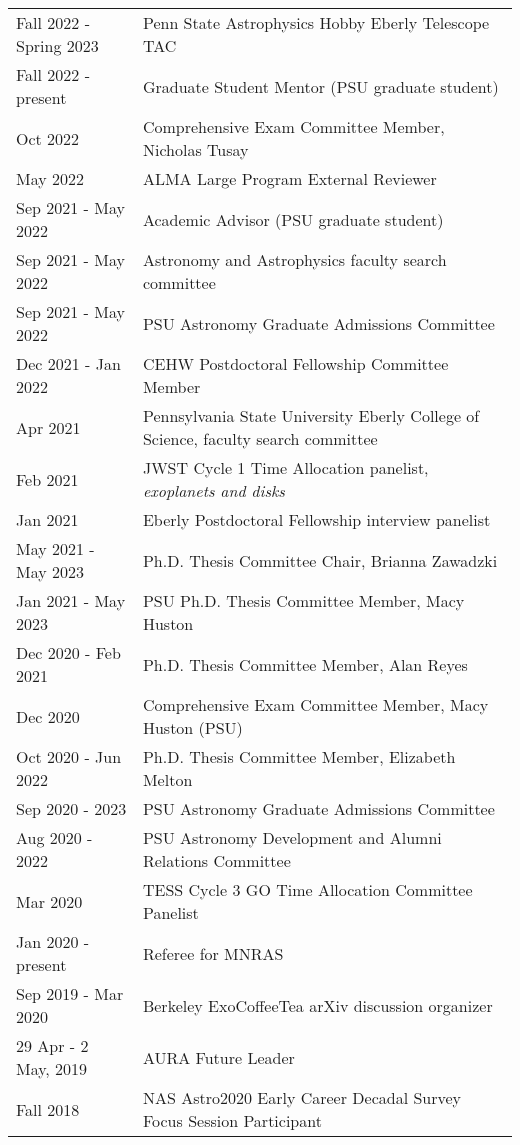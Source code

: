 \begin{tabular*}{\textwidth}{@{\hspace{10pt}}p{1.4in}l}
Fall 2022 - Spring 2023 & Penn State Astrophysics Hobby Eberly Telescope TAC \\
Fall 2022 - present & Graduate Student Mentor (PSU graduate student) \\ %
Oct 2022 & Comprehensive Exam Committee Member, Nicholas Tusay \\
May 2022 & ALMA Large Program External Reviewer \\
Sep 2021 - May 2022 & Academic Advisor (PSU graduate student) \\ %
Sep 2021 - May 2022 & Astronomy and Astrophysics faculty search committee\\
Sep 2021 - May 2022 & PSU Astronomy Graduate Admissions Committee \\ 
Dec 2021 - Jan 2022 & CEHW Postdoctoral Fellowship Committee Member \\
Apr 2021 & Pennsylvania State University Eberly College of Science, faculty search committee\\
Feb 2021 & JWST Cycle 1 Time Allocation panelist, \emph{exoplanets and disks}\\
Jan 2021 & Eberly Postdoctoral Fellowship interview panelist\\
May 2021 - May 2023 & Ph.D. Thesis Committee Chair, Brianna Zawadzki\\
Jan 2021 - May 2023 & PSU Ph.D. Thesis Committee Member, Macy Huston\\
Dec 2020 - Feb 2021 & Ph.D. Thesis Committee Member, Alan Reyes\\
Dec 2020 & Comprehensive Exam Committee Member, Macy Huston (PSU)\\
Oct 2020 - Jun 2022 & Ph.D. Thesis Committee Member, Elizabeth Melton\\
Sep 2020 - 2023 & PSU Astronomy Graduate Admissions Committee \\ 
Aug 2020 - 2022 & PSU Astronomy Development and Alumni Relations Committee \\
Mar 2020 & TESS Cycle 3 GO Time Allocation Committee Panelist \\
Jan 2020 - present & Referee for MNRAS \\ 
Sep 2019 - Mar 2020 & Berkeley ExoCoffeeTea arXiv discussion organizer \\ 
29 Apr - 2 May, 2019 & AURA Future Leader \\
Fall 2018 & NAS Astro2020 Early Career Decadal Survey Focus Session Participant \\

\end{tabular*}
